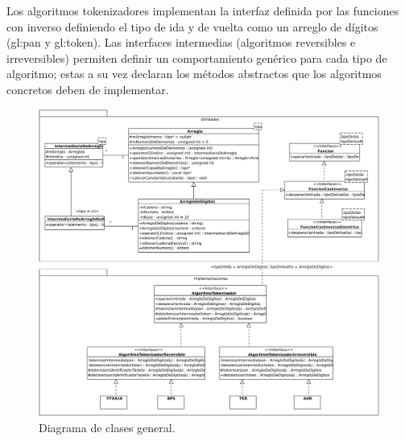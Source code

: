 Los algoritmos tokenizadores implementan la interfaz definida por las
funciones con inverso definiendo el tipo de ida y de vuelta como un
arreglo de dígitos (\gls{gl:pan} y \gls{gl:token}). Las interfaces intermedias
(algoritmos reversibles e irreversibles) permiten definir un comportamiento
genérico para cada tipo de algoritmo; estas a su vez declaran los métodos
abstractos que los algoritmos concretos deben de implementar.

\begin{figure}
  \begin{center}
    \includegraphics[width=1.0\linewidth]{diagramas/diagrama_general.png}
    \caption{Diagrama de clases general.}
    \label{clases_general}
  \end{center}
\end{figure}


